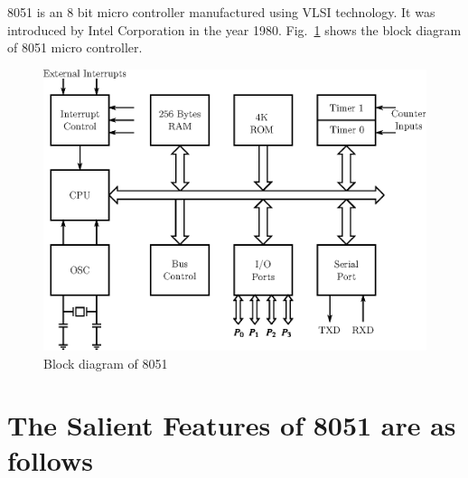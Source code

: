 8051 is an 8 bit micro controller manufactured using VLSI technology. It was introduced by Intel Corporation in the year 1980. Fig.~\ref{fig7.7} shows the block diagram of 8051 micro controller.
\begin{figure}[H]
\centering
\includegraphics[scale=.9]{chap7/fig7.7.eps}
\medskip
\caption{Block diagram of 8051}\label{fig7.7}
\end{figure}

\section{The Salient Features of 8051 are as follows}\label{sec7.13}

